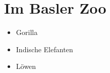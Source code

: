 \section{Im Basler Zoo}

\begin{itemize}
 
\item Gorilla
 
\item Indische Elefanten
 
\item Löwen

\end{itemize}
   

